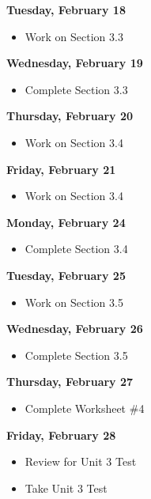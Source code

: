 \documentclass[11pt]{article}
\begin{document}
\textbf{Tuesday, February 18}

\begin{itemize}
\item Work on Section 3.3
\end{itemize}

\textbf{Wednesday, February 19}

\begin{itemize}
\item Complete Section 3.3
\end{itemize}

\textbf{Thursday, February 20}

\begin{itemize}
\item Work on Section 3.4
\end{itemize}

\textbf{Friday, February 21}

\begin{itemize}
\item Work on Section 3.4
\end{itemize}

\textbf{Monday, February 24}

\begin{itemize}
\item Complete Section 3.4
\end{itemize}

\textbf{Tuesday, February 25}

\begin{itemize}
\item Work on Section 3.5
\end{itemize}

\textbf{Wednesday, February 26}

\begin{itemize}
\item Complete Section 3.5
\end{itemize}

\textbf{Thursday, February 27}

\begin{itemize}
\item Complete Worksheet \#4
\end{itemize}

\textbf{Friday, February 28}

\begin{itemize}
\item Review for Unit 3 Test
\item Take Unit 3 Test
\end{itemize}
\end{document}
